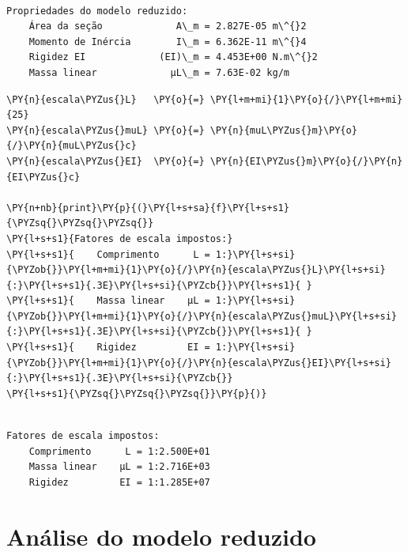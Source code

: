     \begin{Verbatim}[commandchars=\\\{\}]

Propriedades do modelo reduzido:
    Área da seção             A\_m = 2.827E-05 m\^{}2
    Momento de Inércia        I\_m = 6.362E-11 m\^{}4
    Rigidez EI             (EI)\_m = 4.453E+00 N.m\^{}2
    Massa linear             μL\_m = 7.63E-02 kg/m

    \end{Verbatim}

    \begin{tcolorbox}[breakable, size=fbox, boxrule=1pt, pad at break*=1mm,colback=cellbackground, colframe=cellborder]
\begin{Verbatim}[commandchars=\\\{\}]
\PY{n}{escala\PYZus{}L}   \PY{o}{=} \PY{l+m+mi}{1}\PY{o}{/}\PY{l+m+mi}{25}
\PY{n}{escala\PYZus{}muL} \PY{o}{=} \PY{n}{muL\PYZus{}m}\PY{o}{/}\PY{n}{muL\PYZus{}c}
\PY{n}{escala\PYZus{}EI}  \PY{o}{=} \PY{n}{EI\PYZus{}m}\PY{o}{/}\PY{n}{EI\PYZus{}c}

\PY{n+nb}{print}\PY{p}{(}\PY{l+s+sa}{f}\PY{l+s+s1}{\PYZsq{}\PYZsq{}\PYZsq{}}
\PY{l+s+s1}{Fatores de escala impostos:}
\PY{l+s+s1}{    Comprimento      L = 1:}\PY{l+s+si}{\PYZob{}}\PY{l+m+mi}{1}\PY{o}{/}\PY{n}{escala\PYZus{}L}\PY{l+s+si}{:}\PY{l+s+s1}{.3E}\PY{l+s+si}{\PYZcb{}}\PY{l+s+s1}{ }
\PY{l+s+s1}{    Massa linear    μL = 1:}\PY{l+s+si}{\PYZob{}}\PY{l+m+mi}{1}\PY{o}{/}\PY{n}{escala\PYZus{}muL}\PY{l+s+si}{:}\PY{l+s+s1}{.3E}\PY{l+s+si}{\PYZcb{}}\PY{l+s+s1}{ }
\PY{l+s+s1}{    Rigidez         EI = 1:}\PY{l+s+si}{\PYZob{}}\PY{l+m+mi}{1}\PY{o}{/}\PY{n}{escala\PYZus{}EI}\PY{l+s+si}{:}\PY{l+s+s1}{.3E}\PY{l+s+si}{\PYZcb{}}
\PY{l+s+s1}{\PYZsq{}\PYZsq{}\PYZsq{}}\PY{p}{)}
\end{Verbatim}
\end{tcolorbox}

    \begin{Verbatim}[commandchars=\\\{\}]

Fatores de escala impostos:
    Comprimento      L = 1:2.500E+01
    Massa linear    μL = 1:2.716E+03
    Rigidez         EI = 1:1.285E+07

    \end{Verbatim}

    \hypertarget{anuxe1lise-do-modelo-reduzido}{%
\section{Análise do modelo
reduzido}\label{anuxe1lise-do-modelo-reduzido}}

